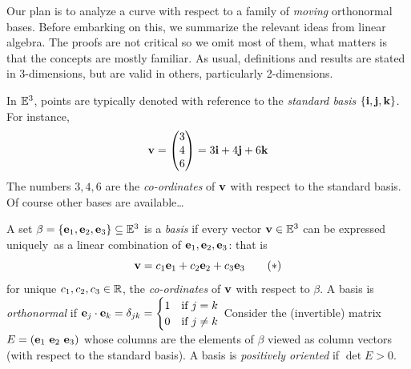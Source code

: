 Our plan is to analyze a curve with respect to a family of \emph{moving} orthonormal bases. Before embarking on this, we summarize the relevant ideas from linear algebra. The proofs are not critical so we omit most of them, what matters is that the concepts are mostly familiar. As usual, definitions and results are stated in 3-dimensions, but are valid in others, particularly 2-dimensions.\medbreak

In $\mathbb{E}^3$, points are typically denoted with reference to the \emph{standard basis} $\{{\mathbf{i}},{\mathbf{j}},{\mathbf{k}}\}$. For instance,
\[{\mathbf{v}}=\begin{pmatrix}3\\4\\6\end{pmatrix}=3{\mathbf{i}}+4{\mathbf{j}}+6{\mathbf{k}}\]
The numbers $3,4,6$ are the \emph{co-ordinates} of ${\mathbf{v}}$ with respect to the standard basis. Of course other bases are available\ldots

\begin{defn}{}{}
A set $\beta=\{{\mathbf{e}}_1,{\mathbf{e}}_2,{\mathbf{e}}_3\}\subseteq\mathbb{E}^3$ is a \emph{basis} if every vector ${\mathbf{v}}\in\mathbb{E}^3$ can be expressed uniquely\footnotemark\ as a linear combination of ${\mathbf{e}}_1,{\mathbf{e}}_2,{\mathbf{e}}_3$: that is
\[{\mathbf{v}}=c_1{\mathbf{e}}_1+c_2{\mathbf{e}}_2+c_3{\mathbf{e}}_3\tag{$\ast$}\]
for unique $c_1,c_2,c_3\in\mathbb{R}$, the \emph{co-ordinates} of ${\mathbf{v}}$ with respect to $\beta$.\smallbreak
A basis is \emph{orthonormal} if ${\mathbf{e}}_j\cdot{\mathbf{e}}_k=\delta_{jk}=\begin{cases}
1&\text{if }j=k\\
0&\text{if }j\neq k
\end{cases}$\smallbreak
Consider the (invertible) matrix $E=({\mathbf{e}}_1\ {\mathbf{e}}_2\ {\mathbf{e}}_3)$ whose columns are the elements of $\beta$ viewed as column vectors (with respect to the standard basis). A basis is \emph{positively oriented} if $\det E>0$.
\end{defn}



